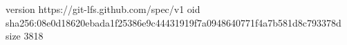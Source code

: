 version https://git-lfs.github.com/spec/v1
oid sha256:08e0d18620ebada1f25386e9c44431919f7a0948640771f4a7b581d8c793378d
size 3818
